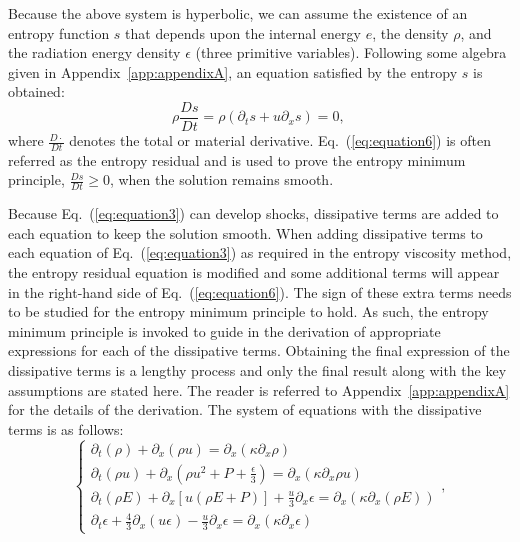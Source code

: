 \documentclass[review]{elsarticle}
\newcommand{\eqt}[1]{Eq.~(\ref{#1})}                     %
\newcommand{\app}[1]{Appendix~\ref{#1}}                     %
\begin{document}
Because the above system is hyperbolic, we can assume the existence of an entropy function $s$ \cite{Lax} that depends upon the internal energy $e$, the density $\rho$, and the radiation energy density $\epsilon$ (three primitive variables). Following some algebra given in \app{app:appendixA}, an equation satisfied by the entropy $s$ is obtained:
\begin{equation}
\label{eq:equation6}
\rho \frac{Ds}{Dt} = \rho \left( \partial_t s + u \partial_x s \right) = 0 \text{, }
\end{equation}
where $\frac{D \cdot}{Dt}$ denotes the total or material derivative. \eqt{eq:equation6} is often referred as the entropy residual and is used to prove the entropy minimum principle, $\frac{Ds}{Dt} \geq 0$, \cite{entropy} when the solution remains smooth.

Because \eqt{eq:equation3} can develop shocks, dissipative terms are added to each equation to keep the solution smooth. When adding dissipative terms to each equation of \eqt{eq:equation3} as required in the entropy viscosity method, the entropy residual equation is modified and some additional terms will appear in the right-hand side of \eqt{eq:equation6}. The sign of these extra terms needs to be studied for the entropy minimum principle to hold. As such, the entropy minimum principle is invoked to guide in the derivation of appropriate expressions for each of the dissipative terms. Obtaining the final expression of the dissipative terms is a lengthy process and only the final result along with the key assumptions are stated here. The reader is referred to \app{app:appendixA} for the details of the derivation. The system of equations with the dissipative terms is as follows:
\begin{equation}
\label{eq:equation7}
\left\{
\begin{array}{lll}
\partial_t \left( \rho \right) + \partial_x\left( \rho u \right) = \partial_x \left( \kappa \partial_x \rho \right) \\
\partial_t \left( \rho u\right) + \partial_x \left(\rho u^2 + P + \frac{\epsilon}{3} \right) = \partial_x \left( \kappa \partial_x \rho u \right) \\
\partial_t \left( \rho E\right) + \partial_x \left[ u \left( \rho E + P \right) \right] + \frac{u}{3} \partial_x \epsilon = \partial_x \left( \kappa \partial_x(\rho E) \right)\\
\partial_t \epsilon + \frac{4}{3} \partial_x \left( u \epsilon \right) - \frac{u}{3} \partial_x \epsilon = \partial_x \left( \kappa \partial_x \epsilon \right)
\end{array}
\right. ,
\end{equation}
\end{document}
